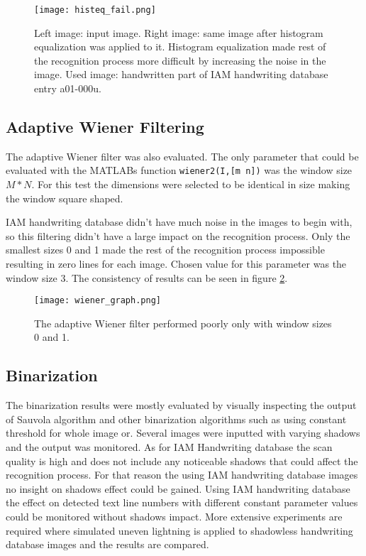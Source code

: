 \documentclass{article}
\def\code#1{\texttt{#1}}
\begin{document}
    \begin{figure}[!ht]
      \centering
      \texttt{[image: histeq\_fail.png]}
      \caption{Left image: input image. Right image: same image after histogram equalization was applied to it. Histogram equalization made rest of the recognition process more difficult by increasing the noise in the image. Used image: handwritten part of IAM handwriting database entry a01-000u.
      \label{fig:histeqfail}}
    \end{figure}

  \subsection{Adaptive Wiener Filtering}
    The adaptive Wiener filter was also evaluated. The only parameter that could be evaluated with the MATLABs function \code{wiener2(I,[m n])} was the window size $M * N$. For this test the dimensions were selected to be identical in size making the window square shaped.

    IAM handwriting database didn't have much noise in the images to begin with, so this filtering didn't have a large impact on the recognition process. Only the smallest sizes 0 and 1 made the rest of the recognition process impossible resulting in zero lines for each image. Chosen value for this parameter was the window size 3. The consistency of results can be seen in figure \ref{fig:wienertest}.

    \begin{figure}[!ht]
      \centering
      \texttt{[image: wiener\_graph.png]}
      \caption{The adaptive Wiener filter performed poorly only with window sizes 0 and 1.
      \label{fig:wienertest}}
    \end{figure}

  \subsection{Binarization}
    The binarization results were mostly evaluated by visually inspecting the output of Sauvola algorithm and other binarization algorithms such as using constant threshold for whole image or. Several images were inputted with varying shadows and the output was monitored. As for IAM Handwriting database the scan quality is high and does not include any noticeable shadows that could affect the recognition process. For that reason the using IAM handwriting database images no insight on shadows effect could be gained. Using IAM handwriting database the effect on detected text line numbers with different constant parameter values could be monitored without shadows impact. More extensive experiments are required where simulated uneven lightning is applied to shadowless handwriting database images and the results are compared.
\end{document}
